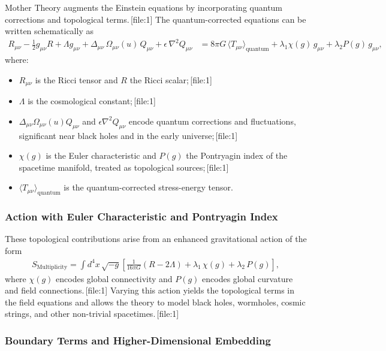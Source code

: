 \documentclass[11pt]{article}
\begin{document}
Mother Theory augments the Einstein equations by incorporating quantum corrections and topological terms.\,[file:1] The quantum-corrected equations can be written schematically as
\begin{align}
R_{\mu\nu}
-\frac{1}{2} g_{\mu\nu} R
+\Lambda g_{\mu\nu}
+\Delta_{\mu\nu}\,\Omega_{\mu\nu}(u)\,Q_{\mu\nu}
+\epsilon\,\nabla^{2} Q_{\mu\nu}
&= 8\pi G \,\langle T_{\mu\nu}\rangle_{\mathrm{quantum}}
+\lambda_1 \chi(g)\,g_{\mu\nu}
+\lambda_2 P(g)\,g_{\mu\nu},
\end{align}
where:
\begin{itemize}
  \item \(R_{\mu\nu}\) is the Ricci tensor and \(R\) the Ricci scalar;\,[file:1]
  \item \(\Lambda\) is the cosmological constant;\,[file:1]
  \item \(\Delta_{\mu\nu}\Omega_{\mu\nu}(u)Q_{\mu\nu}\) and \(\epsilon\nabla^{2}Q_{\mu\nu}\) encode quantum corrections and fluctuations, significant near black holes and in the early universe;\,[file:1]
  \item \(\chi(g)\) is the Euler characteristic and \(P(g)\) the Pontryagin index of the spacetime manifold, treated as topological sources;\,[file:1]
  \item \(\langle T_{\mu\nu}\rangle_{\mathrm{quantum}}\) is the quantum-corrected stress-energy tensor.
\end{itemize}

\subsubsection{Action with Euler Characteristic and Pontryagin Index}

These topological contributions arise from an enhanced gravitational action of the form
\begin{align}
S_{\mathrm{Multiplicity}}
=
\int d^4x\,\sqrt{-g}\left[
\frac{1}{16\pi G}(R-2\Lambda)
+\lambda_1\,\chi(g)+\lambda_2\,P(g)
\right],
\end{align}
where \(\chi(g)\) encodes global connectivity and \(P(g)\) encodes global curvature and field connections.\,[file:1] Varying this action yields the topological terms in the field equations and allows the theory to model black holes, wormholes, cosmic strings, and other non-trivial spacetimes.\,[file:1]

\subsubsection{Boundary Terms and Higher-Dimensional Embedding}
\end{document}
